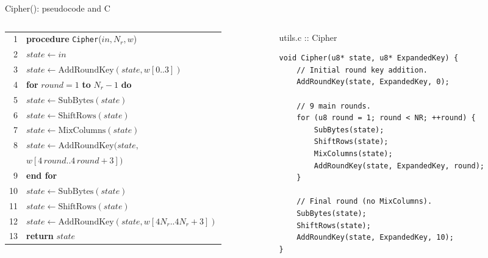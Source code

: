 \documentclass[aspectratio=169,10pt]{beamer}
\makeatletter
\newcommand{\fn}[1]{\mathrm{#1}}
\newcommand{\Nr}{N_{r}}
\newcommand{\kw}[1]{\textbf{#1}}
\newcommand{\ind}{\hspace*{1.1em}}
\newenvironment{pseudo}{\par\footnotesize\renewcommand{\arraystretch}{1.12}%
  \begin{tabular}{@{}r@{\hspace{5pt}}l@{}}}{\end{tabular}\par}
\makeatother
\begin{document}
\begin{frame}[fragile]{Cipher(): pseudocode and C}
\begin{columns}[T]
\begin{column}{0.52\textwidth}
\begin{pseudo}
1 & \kw{procedure} \texttt{Cipher}($\mathit{in},\Nr,w$) \\
2 & \ind $\mathit{state}\leftarrow \mathit{in}$ \\
3 & \ind $\mathit{state}\leftarrow\fn{AddRoundKey}(\mathit{state},w[0..3])$ \\
4 & \ind \kw{for} $\mathit{round}=1$ \kw{to} $\Nr-1$ \kw{do} \\
5 & \ind\ind $\mathit{state}\leftarrow\fn{SubBytes}(\mathit{state})$ \\
6 & \ind\ind $\mathit{state}\leftarrow\fn{ShiftRows}(\mathit{state})$ \\
7 & \ind\ind $\mathit{state}\leftarrow\fn{MixColumns}(\mathit{state})$ \\
8 & \ind\ind $\mathit{state}\leftarrow\fn{AddRoundKey}(\mathit{state},$ \\
  & \ind\ind\ind $w[4\,\mathit{round}..4\,\mathit{round}{+}3])$ \\
9 & \ind \kw{end for} \\
10 & \ind $\mathit{state}\leftarrow\fn{SubBytes}(\mathit{state})$ \\
11 & \ind $\mathit{state}\leftarrow\fn{ShiftRows}(\mathit{state})$ \\
12 & \ind $\mathit{state}\leftarrow\fn{AddRoundKey}(\mathit{state},w[4\Nr..4\Nr{+}3])$ \\
13 & \ind \kw{return} $\mathit{state}$ \\
\end{pseudo}
\end{column}
\begin{column}{0.46\textwidth}
\begin{tbox}{utils.c :: Cipher}
\begin{lstlisting}
void Cipher(u8* state, u8* ExpandedKey) {
    // Initial round key addition.
    AddRoundKey(state, ExpandedKey, 0);

    // 9 main rounds.
    for (u8 round = 1; round < NR; ++round) {
        SubBytes(state);
        ShiftRows(state);
        MixColumns(state);
        AddRoundKey(state, ExpandedKey, round);
    }

    // Final round (no MixColumns).
    SubBytes(state);
    ShiftRows(state);
    AddRoundKey(state, ExpandedKey, 10);
}
\end{lstlisting}
\end{tbox}
\end{column}
\end{columns}
\end{frame}
\end{document}
